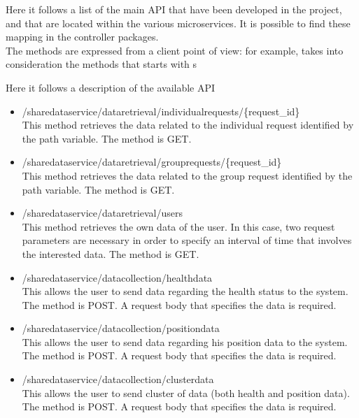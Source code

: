 Here it follows a list of the main API that have been developed in the project, and that are located
within the various microservices.
It is possible to find these mapping in the controller packages. \\
The methods are expressed from a client point of view: for example, takes into consideration the methods that starts with s 

Here it follows a description of the available API

\begin{itemize}
\item /sharedataservice/dataretrieval/individualrequests/\{request\_id\} \\
This method retrieves the data related to the individual request identified by the path variable. The method is GET.

\item /sharedataservice/dataretrieval/grouprequests/\{request\_id\} \\
This method retrieves the data related to the group request identified by the path variable. The method is GET.

\item /sharedataservice/dataretrieval/users \\
This method retrieves the own data of the user. In this case, two request parameters
are necessary in order to specify an interval of time that involves the interested data.
The method is GET.

\item /sharedataservice/datacollection/healthdata \\
This allows the user to send data regarding the health status to the system. The method is POST.
A request body that specifies the data is required.

\item /sharedataservice/datacollection/positiondata \\
This allows the user to send data regarding his position data to the system. The method is POST.
A request body that specifies the data is required.

\item /sharedataservice/datacollection/clusterdata \\
This allows the user to send cluster of data (both health and position data). The method is POST.
A request body that specifies the data is required.

\end{itemize}



